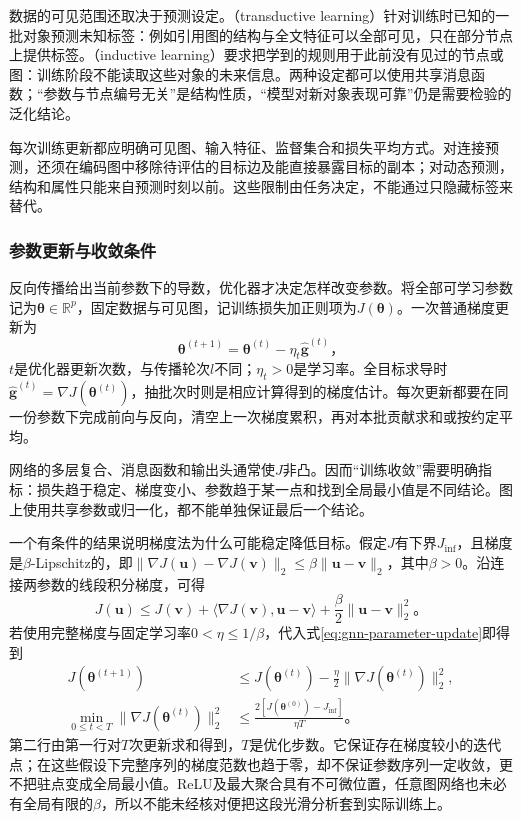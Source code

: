 数据的可见范围还取决于预测设定。（transductive learning）针对训练时已知的一批对象预测未知标签：例如引用图的结构与全文特征可以全部可见，只在部分节点上提供标签。（inductive learning）要求把学到的规则用于此前没有见过的节点或图：训练阶段不能读取这些对象的未来信息。两种设定都可以使用共享消息函数；“参数与节点编号无关”是结构性质，“模型对新对象表现可靠”仍是需要检验的泛化结论。

每次训练更新都应明确可见图、输入特征、监督集合和损失平均方式。对连接预测，还须在编码图中移除待评估的目标边及能直接暴露目标的副本；对动态预测，结构和属性只能来自预测时刻以前。这些限制由任务决定，不能通过只隐藏标签来替代。

\subsubsection{参数更新与收敛条件}
\label{sec:gnn-optimization-convergence}

反向传播给出当前参数下的导数，优化器才决定怎样改变参数。将全部可学习参数记为$\bm{\theta}\in\mathbb{R}^{p}$，固定数据与可见图，记训练损失加正则项为$J(\bm{\theta})$。一次普通梯度更新为
\begin{equation}
  \bm{\theta}^{(t+1)}=\bm{\theta}^{(t)}
    -\eta_t\widehat{\bm{g}}^{(t)}\text{，}
  \label{eq:gnn-parameter-update}
\end{equation}
$t$是优化器更新次数，与传播轮次$l$不同；$\eta_t>0$是学习率。全目标求导时$\widehat{\bm{g}}^{(t)}=\nabla J(\bm{\theta}^{(t)})$，抽批次时则是相应计算得到的梯度估计。每次更新都要在同一份参数下完成前向与反向，清空上一次梯度累积，再对本批贡献求和或按约定平均。

网络的多层复合、消息函数和输出头通常使$J$非凸。因而“训练收敛”需要明确指标：损失趋于稳定、梯度变小、参数趋于某一点和找到全局最小值是不同结论。图上使用共享参数或归一化，都不能单独保证最后一个结论。

一个有条件的结果说明梯度法为什么可能稳定降低目标。假定$J$有下界$J_{\inf}$，且梯度是$\beta$-Lipschitz的，即$\lVert\nabla J(\bm{u})-\nabla J(\bm{v})\rVert_2\leq\beta\lVert\bm{u}-\bm{v}\rVert_2$，其中$\beta>0$。沿连接两参数的线段积分梯度，可得
\[
  J(\bm{u})\leq J(\bm{v})+
  \langle\nabla J(\bm{v}),\bm{u}-\bm{v}\rangle
  +\frac{\beta}{2}\lVert\bm{u}-\bm{v}\rVert_2^2\text{。}
\]
若使用完整梯度与固定学习率$0<\eta\leq1/\beta$，代入式\eqref{eq:gnn-parameter-update}即得到
\begin{equation}
  \begin{aligned}
    J(\bm{\theta}^{(t+1)})
      &\leq J(\bm{\theta}^{(t)})
        -\frac{\eta}{2}\lVert\nabla J(\bm{\theta}^{(t)})\rVert_2^2,\\
    \min_{0\leq t<T}\lVert\nabla J(\bm{\theta}^{(t)})\rVert_2^2
      &\leq\frac{2[J(\bm{\theta}^{(0)})-J_{\inf}]}{\eta T}\text{。}
  \end{aligned}
  \label{eq:gnn-gradient-descent-bound}
\end{equation}
第二行由第一行对$T$次更新求和得到，$T$是优化步数。它保证存在梯度较小的迭代点；在这些假设下完整序列的梯度范数也趋于零，却不保证参数序列一定收敛，更不把驻点变成全局最小值。ReLU及最大聚合具有不可微位置，任意图网络也未必有全局有限的$\beta$，所以不能未经核对便把这段光滑分析套到实际训练上。

